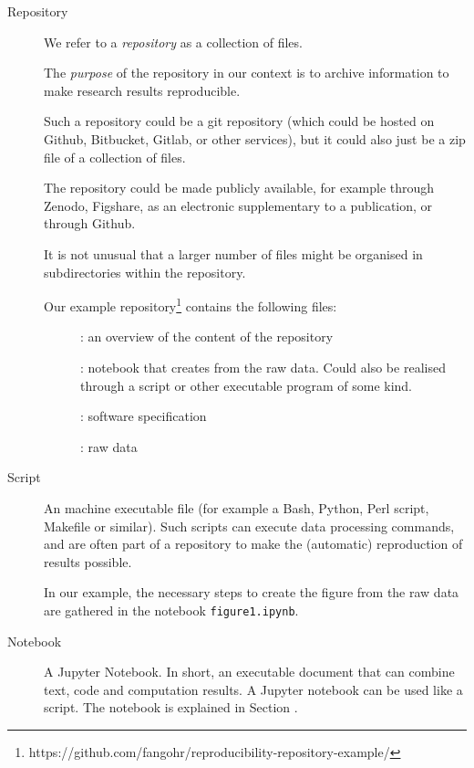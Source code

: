 \begin{description}
\item[Repository] We refer to a \emph{repository} as a collection of files.

The \emph{purpose} of the repository in our context is to archive information to make
research results reproducible.

Such a repository could be a git repository (which could be hosted on Github,
Bitbucket, Gitlab, or other services), but it could also just be a zip file of a
collection of files.

The repository could be made publicly available, for example through Zenodo,
Figshare, as an electronic supplementary to a publication, or through Github.

It is not unusual that a larger number of files might be
organised in subdirectories within the repository.

Our example repository\footnote{
  https://github.com/fangohr/reproducibility-repository-example/} \cite{ReproducibilityRepositoryExample2022} contains the following files:

\begin{description}
\item[]: an overview of the content of the repository
\item[]: notebook that creates
   from
  the raw data. Could also be realised through a script or other executable
  program of some kind.
\item[]: software specification
\item[]: raw data
\end{description}

\item[Script] An machine executable file (for example a Bash, Python, Perl
script, Makefile or similar). Such scripts can execute data processing commands,
and are often part of a repository to make the (automatic) reproduction of
results possible.

In our example, the necessary steps to create the figure from the raw data are
gathered in the notebook \texttt{figure1.ipynb}.

\item[Notebook] A Jupyter Notebook. In short, an executable document that can
  combine text, code and computation results. A Jupyter notebook can be used like a
  script. The notebook is explained in Section .


\end{description}
